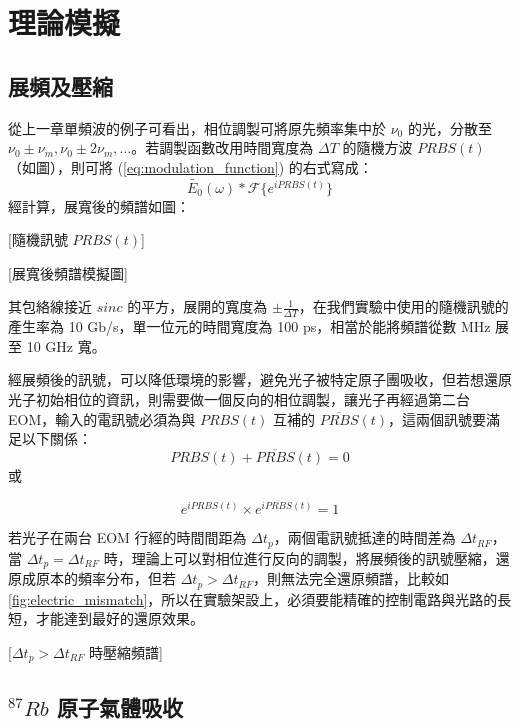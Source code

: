 \documentclass[class=NCU_thesis, crop=false]{standalone}
\begin{document}
\chapter{理論模擬}
\section{展頻及壓縮}
從上一章單頻波的例子可看出，相位調製可將原先頻率集中於 $\nu_{0}$ 的光，分散至 $\nu_{0}\pm\nu_{m}, \nu_{0}\pm2\nu_{m},\dots$。若調製函數改用時間寬度為 $\Delta T$ 的隨機方波 $PRBS(t)$ （如圖），則可將 (\ref{eq:modulation_function}) 的右式寫成：
\begin{equation}
    \tilde{E_{0}}(\omega)*\mathscr{F}\{{e^{i PRBS(t)}}\}
\end{equation}
經計算，展寬後的頻譜如圖：

[隨機訊號 $PRBS(t)$]

[展寬後頻譜模擬圖]

其包絡線接近 $sinc$ 的平方，展開的寬度為 $\pm\frac{1}{\Delta T}$，在我們實驗中使用的隨機訊號的產生率為 10 Gb/s，單一位元的時間寬度為 100 ps，相當於能將頻譜從數 MHz 展至 10 GHz 寬。

經展頻後的訊號，可以降低環境的影響，避免光子被特定原子團吸收，但若想還原光子初始相位的資訊，則需要做一個反向的相位調製，讓光子再經過第二台 EOM，輸入的電訊號必須為與 $PRBS(t)$ 互補的 $\overline{PRBS}(t)$，這兩個訊號要滿足以下關係：
\begin{equation}
    PRBS(t)+\overline{PRBS}(t)=0
\end{equation}
或

\begin{equation}
    e^{i PRBS(t)}\times e^{i \overline{PRBS}(t)}=1
\end{equation}

若光子在兩台 EOM 行經的時間間距為 $\Delta t_{p}$，兩個電訊號抵達的時間差為 $\Delta t_{RF}$，當 $\Delta t_{p}=\Delta t_{RF}$ 時，理論上可以對相位進行反向的調製，將展頻後的訊號壓縮，還原成原本的頻率分布，但若 $\Delta t_{p}>\Delta t_{RF}$，則無法完全還原頻譜，比較如\cref{fig:electric_mismatch}，所以在實驗架設上，必須要能精確的控制電路與光路的長短，才能達到最好的還原效果。

[$\Delta t_{p}>\Delta t_{RF}$ 時壓縮頻譜]

\section{$^{87}Rb$ 原子氣體吸收}
\end{document}
